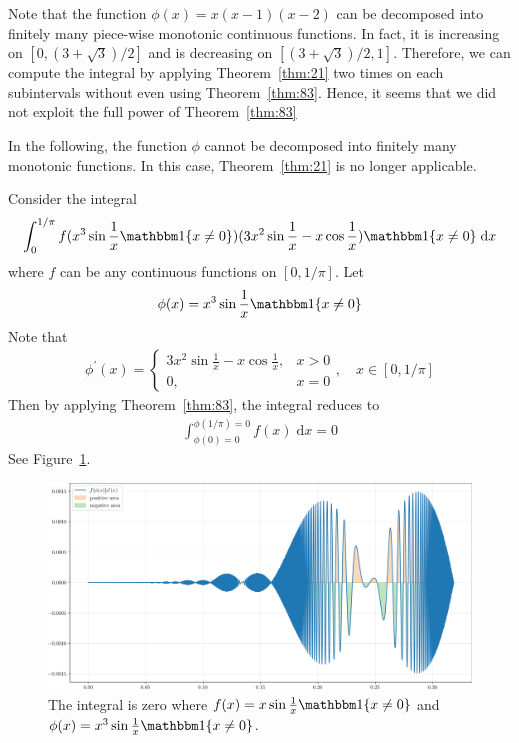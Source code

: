 \documentclass[thmcnt=section, 12pt]{my-elegantbook}
\begin{document}
Note that the function $\phi(x) = x(x-1)(x-2)$
can be decomposed into finitely many piece-wise monotonic
continuous functions.
In fact, it is increasing on $[0, (3 + \sqrt{3}) / 2]$
and is decreasing on $[(3 + \sqrt{3}) / 2, 1].$
Therefore, we can compute the integral by applying Theorem~\ref{thm:21}
two times on each subintervals without even using Theorem~\ref{thm:83}.
Hence, it seems that we did not 
exploit the full power of Theorem~\ref{thm:83}

In the following, the function $\phi$ cannot be
decomposed into finitely many monotonic functions.
In this case, Theorem~\ref{thm:21} is no longer applicable.

\begin{example} \label{eg:15}
	Consider the integral
	\begin{align*}
		\int_{0}^{1 / \pi} f(x^3 \sin \frac{1}{x} \ind\{x \neq 0\})
		(3x^2 \sin \frac{1}{x} - x\cos\frac{1}{x})
		\ind\{x \neq 0\} \; \mathrm{d} x
	\end{align*}
	where $f$ can be any continuous functions on $[0, 1 / \pi]$.
	Let
	\begin{align*}
		\phi(x) = x^3 \sin\frac{1}{x} \ind\{x \neq 0\}
	\end{align*}
	Note that 
	\begin{align*}
		\phi^\prime(x) = 
		\begin{cases}
			3x^2 \sin \frac{1}{x} - x\cos\frac{1}{x},
			& x > 0 \\ 
			0,
			& x = 0
		\end{cases}, 
		\quad
		x \in [0, 1 / \pi]
	\end{align*}
	Then by applying Theorem~\ref{thm:83}, the integral
	reduces to 
	\begin{align*}
		\int_{\phi(0) = 0}^{\phi(1 / \pi) = 0} f(x) \; \mathrm{d} x 
		= 0
	\end{align*}
	See Figure~\ref{fig:18}.

	\begin{figure}[ht]
		\centering
		\includegraphics[scale=0.5]{figures/ma-018.png}
		\caption{The integral is zero where $f(x) = x \sin\frac{1}{x} \ind\{ x \neq 0 \}$ and $\phi(x) = x^3 \sin \frac{1}{x} \ind\{x \neq 0\}$.}
		\label{fig:18}
	\end{figure}
\end{example}
\end{document}
